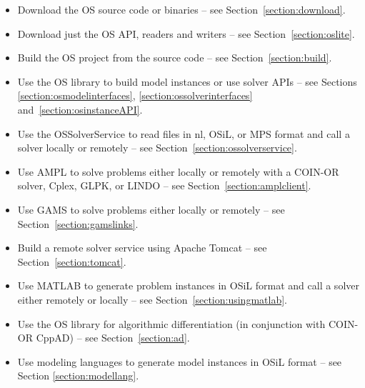 \documentclass[11pt]{article}
\renewcommand{\_}{{\char"5F}}
\renewcommand{\{}{{\char"7B}}
\renewcommand{\}}{{\char"7D}}
\renewcommand{\^}{{\char"0D}}
\renewcommand{\'}{{\char"0D}}
\newif\ifknitro \knitrofalse    %
\begin{document}
\begin{itemize}
\item Download the OS source code or binaries -- see Section~\ref{section:download}.

\item Download just the OS API, readers and writers -- see Section~\ref{section:oslite}.

\item Build the OS project from the source code -- see Section~\ref{section:build}.

\item Use the OS library to build model instances or use solver APIs -- see Sections \ref{section:osmodelinterfaces},
\ref{section:ossolverinterfaces} and~\ref{section:osinstanceAPI}.

\item Use the OSSolverService to read files in nl, OSiL, 
or MPS format and call a solver locally or remotely -- see Section~\ref{section:ossolverservice}.


\item Use AMPL to solve problems either locally or remotely
with a COIN-OR solver, Cplex,
GLPK, \ifknitro Knitro\index{knitro}, \fi
or LINDO -- see Section~\ref{section:amplclient}.

\item Use GAMS to solve problems either locally or remotely -- see Section~\ref{section:gamslinks}.

\item Build a remote solver service using Apache Tomcat -- see Section~\ref{section:tomcat}.

\item Use MATLAB to generate problem instances in OSiL format and call a solver either remotely or locally
 -- see Section~\ref{section:usingmatlab}.

\item Use the OS library for algorithmic differentiation (in conjunction with 
COIN-OR CppAD) -- see Section~\ref{section:ad}.

\item Use modeling languages to generate model instances in OSiL format -- see Section \ref{section:modellang}.
\end{itemize}
\end{document}
